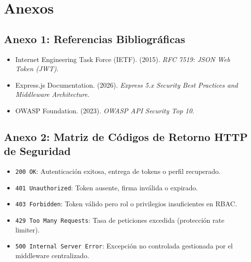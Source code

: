 \documentclass[12pt,a4paper]{article}
\begin{document}
\vspace{0.4cm}

\section{Anexos}

\subsection*{Anexo 1: Referencias Bibliográficas}
\begin{itemize}[leftmargin=1.5em, itemsep=2pt]
    \item Internet Engineering Task Force (IETF). (2015). \textit{RFC 7519: JSON Web Token (JWT)}.
    \item Express.js Documentation. (2026). \textit{Express 5.x Security Best Practices and Middleware Architecture}.
    \item OWASP Foundation. (2023). \textit{OWASP API Security Top 10}.
\end{itemize}

\subsection*{Anexo 2: Matriz de Códigos de Retorno HTTP de Seguridad}
\begin{itemize}[leftmargin=1.5em, itemsep=2pt]
    \item \texttt{200 OK}: Autenticación exitosa, entrega de tokens o perfil recuperado.
    \item \texttt{401 Unauthorized}: Token ausente, firma inválida o expirado.
    \item \texttt{403 Forbidden}: Token válido pero rol o privilegios insuficientes en RBAC.
    \item \texttt{429 Too Many Requests}: Tasa de peticiones excedida (protección rate limiter).
    \item \texttt{500 Internal Server Error}: Excepción no controlada gestionada por el middleware centralizado.
\end{itemize}
\end{document}
